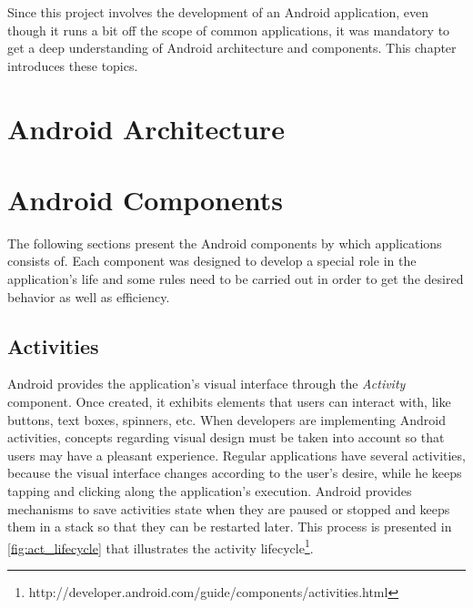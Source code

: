 Since this project involves the development of an Android application, even though it runs a bit off the scope of common applications, it was mandatory to get a deep understanding of Android architecture and components. This chapter introduces these topics.

\section{Android Architecture}
\label{sec:android_architecture}


\section{Android Components}

The following sections present the Android components by which applications consists of. Each component was designed to develop a special role in the application's life and some rules need to be carried out in order to get the desired behavior as well as efficiency. 

\subsection{Activities}

Android provides the application's visual interface through the \textit{Activity} component. Once created, it exhibits elements that users can interact with, like buttons, text boxes, spinners, etc. When developers are implementing Android activities, concepts regarding visual design must be taken into account so that users may have a pleasant experience. Regular applications have several activities, because the visual interface changes according to the user's desire, while he keeps tapping and clicking along the application's execution. Android provides mechanisms to save activities state when they are paused or stopped and keeps them in a stack so that they can be restarted later. This process is presented in \autoref{fig:act_lifecycle} that illustrates the activity lifecycle\footnote{http://developer.android.com/guide/components/activities.html}.

